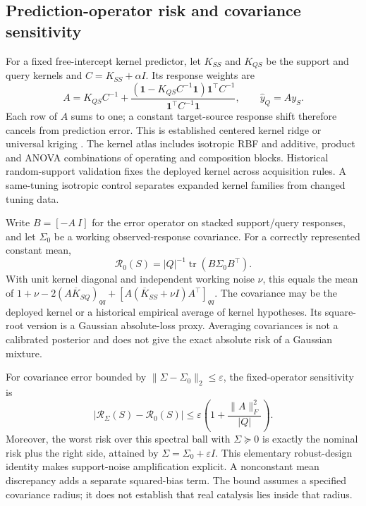 \documentclass[11pt]{article}
\begin{document}
\subsection{Prediction-operator risk and covariance sensitivity}
For a fixed free-intercept kernel predictor, let $K_{SS}$ and $K_{QS}$ be the support and query kernels and $C=K_{SS}+\alpha I$. Its response weights are
\begin{equation}\label{eq:weights}
A=K_{QS}C^{-1}+
\frac{(\mathbf1-K_{QS}C^{-1}\mathbf1)\mathbf1^\top C^{-1}}
{\mathbf1^\top C^{-1}\mathbf1},\qquad \widehat y_Q=Ay_S.
\end{equation}
Each row of $A$ sums to one; a constant target-source response shift therefore cancels from prediction error. This is established centered kernel ridge or universal kriging \cite{gpml}. The kernel atlas includes isotropic RBF and additive, product and ANOVA combinations of operating and composition blocks. Historical random-support validation fixes the deployed kernel across acquisition rules. A same-tuning isotropic control separates expanded kernel families from changed tuning data.

Write $B=[-A\ I]$ for the error operator on stacked support/query responses, and let $\Sigma_0$ be a working observed-response covariance. For a correctly represented constant mean,
\begin{equation}\label{eq:risk}
\mathcal R_0(S)=|Q|^{-1}\operatorname{tr}(B\Sigma_0B^\top).
\end{equation}
With unit kernel diagonal and independent working noise $\nu$, this equals the mean of $1+\nu-2(A\overline K_{SQ})_{qq}+[A(\overline K_{SS}+\nu I)A^\top]_{qq}$. The covariance may be the deployed kernel or a historical empirical average of kernel hypotheses. Its square-root version is a Gaussian absolute-loss proxy. Averaging covariances is not a calibrated posterior and does not give the exact absolute risk of a Gaussian mixture.

For covariance error bounded by $\|\Sigma-\Sigma_0\|_2\leq\varepsilon$, the fixed-operator sensitivity is
\begin{equation}\label{eq:bound}
|\mathcal R_\Sigma(S)-\mathcal R_0(S)|\leq
\varepsilon\left(1+\frac{\|A\|_F^2}{|Q|}\right).
\end{equation}
Moreover, the worst risk over this spectral ball with $\Sigma\succeq0$ is exactly the nominal risk plus the right side, attained by $\Sigma=\Sigma_0+\varepsilon I$. This elementary robust-design identity makes support-noise amplification explicit. A nonconstant mean discrepancy adds a separate squared-bias term. The bound assumes a specified covariance radius; it does not establish that real catalysis lies inside that radius.
\end{document}
